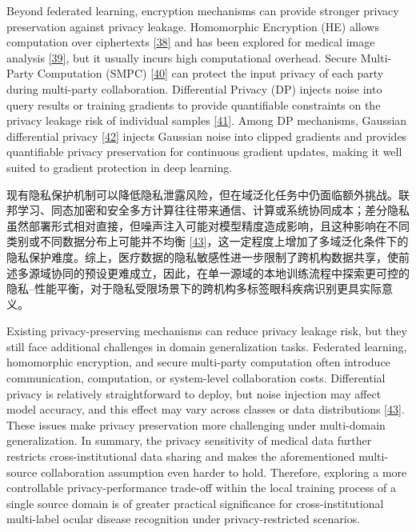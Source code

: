 Beyond federated learning, encryption mechanisms can provide stronger privacy preservation against privacy leakage. Homomorphic Encryption (HE) allows computation over ciphertexts \hyperref[_Ref213950427]{{[}38{]}} and has been explored for medical image analysis \hyperref[_Ref213950433]{{[}39{]}}, but it usually incurs high computational overhead. Secure Multi-Party Computation (SMPC) \hyperref[_Ref213950438]{{[}40{]}} can protect the input privacy of each party during multi-party collaboration. Differential Privacy (DP) injects noise into query results or training gradients to provide quantifiable constraints on the privacy leakage risk of individual samples \hyperref[_Ref213950443]{{[}41{]}}. Among DP mechanisms, Gaussian differential privacy \hyperref[_Ref213950449]{{[}42{]}} injects Gaussian noise into clipped gradients and provides quantifiable privacy preservation for continuous gradient updates, making it well suited to gradient protection in deep learning.

现有隐私保护机制可以降低隐私泄露风险，但在域泛化任务中仍面临额外挑战。联邦学习、同态加密和安全多方计算往往带来通信、计算或系统协同成本；差分隐私虽然部署形式相对直接，但噪声注入可能对模型精度造成影响，且这种影响在不同类别或不同数据分布上可能并不均衡 \hyperref[_Ref213950458]{{[}43{]}}，这一定程度上增加了多域泛化条件下的隐私保护难度。综上，医疗数据的隐私敏感性进一步限制了跨机构数据共享，使前述多源域协同的预设更难成立，因此，在单一源域的本地训练流程中探索更可控的隐私--性能平衡，对于隐私受限场景下的跨机构多标签眼科疾病识别更具实际意义。

Existing privacy-preserving mechanisms can reduce privacy leakage risk, but they still face additional challenges in domain generalization tasks. Federated learning, homomorphic encryption, and secure multi-party computation often introduce communication, computation, or system-level collaboration costs. Differential privacy is relatively straightforward to deploy, but noise injection may affect model accuracy, and this effect may vary across classes or data distributions \hyperref[_Ref213950458]{{[}43{]}}. These issues make privacy preservation more challenging under multi-domain generalization. In summary, the privacy sensitivity of medical data further restricts cross-institutional data sharing and makes the aforementioned multi-source collaboration assumption even harder to hold. Therefore, exploring a more controllable privacy-performance trade-off within the local training process of a single source domain is of greater practical significance for cross-institutional multi-label ocular disease recognition under privacy-restricted scenarios.
